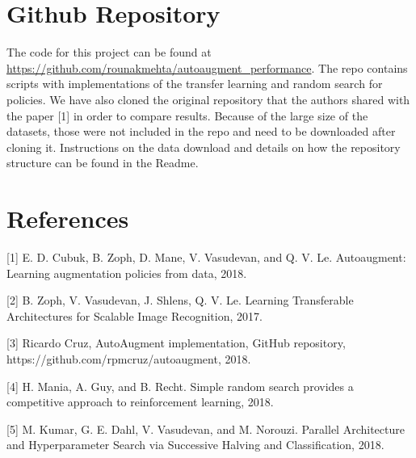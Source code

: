 \documentclass[10pt,twocolumn,letterpaper]{article}
\begin{document}
\section{Github Repository}

The code for this project can be found at \url{https://github.com/rounakmehta/autoaugment_performance}. The repo contains scripts with implementations of the transfer learning and random search for policies. We have also cloned the original repository that the authors shared with the paper [1] in order to compare results. Because of the large size of the datasets, those were not included in the repo and need to be downloaded after cloning it. Instructions on the data download and details on how the repository structure can be found in the Readme.  

\section{References}

{\small



[1] E. D. Cubuk, B. Zoph, D. Mane, V. Vasudevan, and Q. V. Le. Autoaugment:   Learning  augmentation  policies  from  data, 2018. \newline

[2] B. Zoph, V. Vasudevan, J. Shlens, Q. V. Le. Learning Transferable Architectures for Scalable Image Recognition, 2017. \newline

[3] Ricardo Cruz, AutoAugment implementation, GitHub repository, https://github.com/rpmcruz/autoaugment, 2018. \newline

[4] H. Mania, A. Guy, and B. Recht. Simple random search provides a competitive approach to reinforcement learning, 2018.\newline

[5] M. Kumar, G. E. Dahl, V. Vasudevan, and M. Norouzi. Parallel Architecture and Hyperparameter Search
via Successive Halving and Classification, 2018.\newline

}
\end{document}

